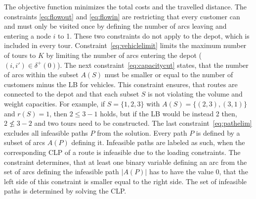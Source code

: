 The objective function minimizes the total costs and the travelled distance. The constraints \ref{eq:flowout} and \ref{eq:flowin}
are restricting that every customer can and must only be visited once by defining the number
of arcs leaving and entering a node $i$ to 1. These two constraints do not apply to the depot,
which is included in every tour. Constraint~\ref{eq:vehiclelimit} limits the maximum number of
tours to $K$ by limiting the number of arcs entering the depot ($(i,i')\in \delta^+(0)$).
The next constraint~\ref{eq:capacitycut} states, that the number of arcs within the subset $A(S)$
must be smaller or equal to the number of customers minus the \gls{LB} for vehicles. This constraint
ensures, that routes are connected to the depot and that each subset $S$ is not violating
the volume and weight capacities. For example, if $S=\{1,2,3\}$ with $A(S)=\{(2,3),(3,1)\}$
and $r(S) = 1$, then $2 \leq 3 - 1$ holds, but if the \gls{LB} would be instead 2 then, $2 \not\leq 3 - 2$
and two tours need to be constructed. The last constraint~\ref{eq:pathelim} excludes all infeasible paths
$P$ from the solution. Every path $P$ is defined by a subset of arcs $A(P)$ defining it. Infeasible
paths are labeled as such, when the corresponding \gls{CLP} of a route is infeasible due to the loading
constraints. The constraint determines, that at least one binary variable defining an arc
from the set of arcs defining the infeasible path $|A(P)|$ has to have the value 0, that the left
side of this constraint is smaller equal to the right side. The set of infeasible paths is determined by
solving the \gls{CLP}.





